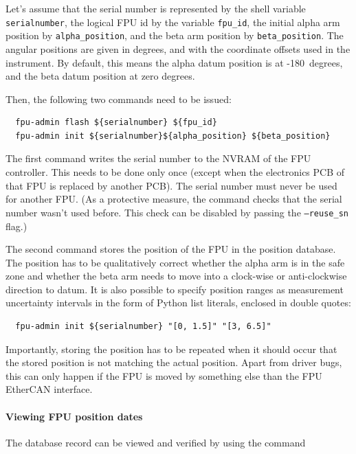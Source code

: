 \documentclass[11pt,a4paper]{report}
\begin{document}
Let's assume that the serial number is represented by the shell
variable \texttt{serialnumber}, the logical FPU id by the variable
\texttt{fpu\_id}, the initial alpha arm position by
\texttt{alpha\_position}, and the beta arm position by
\texttt{beta\_position}. The angular positions are given in degrees,
and with the coordinate offsets used in the instrument. By default,
this means the alpha datum position is at -180\degree\ degrees, and the beta
datum position at zero degrees.

Then, the following two commands need to be issued:

\begin{verbatim}
  fpu-admin flash ${serialnumber} ${fpu_id}
  fpu-admin init ${serialnumber}${alpha_position} ${beta_position}
\end{verbatim}

The first command writes the serial number to the NVRAM of the FPU
controller. This needs to be done only once (except when the
electronics PCB of that FPU is replaced by another PCB). The serial
number must never be used for another FPU. (As a protective measure,
the command checks that the serial number wasn't used before. This
check can be disabled by passing the \texttt{--reuse\_sn} flag.)

The second command stores the position of the FPU in the position
database. The position has to be qualitatively correct whether the
alpha arm is in the safe zone and whether the beta arm needs to move
into a clock-wise or anti-clockwise direction to datum. It is also
possible to specify position ranges as measurement uncertainty
intervals in the form of Python list literals, enclosed in double
quotes:
\begin{verbatim}
  fpu-admin init ${serialnumber} "[0, 1.5]" "[3, 6.5]"
\end{verbatim}


Importantly, storing the position has to be repeated when it should
occur that the stored position is not matching the actual
position. Apart from driver bugs, this can only happen if the FPU is
moved by something else than the FPU EtherCAN interface.

\paragraph{Viewing FPU position dates}

The database record can be viewed and verified by using the command
\end{document}
